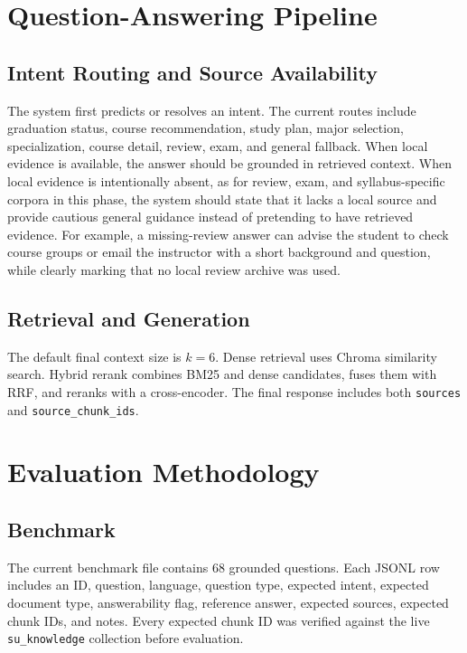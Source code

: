 \documentclass[11pt]{article}
\begin{document}
\section{Question-Answering Pipeline}
\subsection{Intent Routing and Source Availability}
The system first predicts or resolves an intent. The current routes include graduation status, course recommendation, study plan, major selection, specialization, course detail, review, exam, and general fallback. When local evidence is available, the answer should be grounded in retrieved context. When local evidence is intentionally absent, as for review, exam, and syllabus-specific corpora in this phase, the system should state that it lacks a local source and provide cautious general guidance instead of pretending to have retrieved evidence. For example, a missing-review answer can advise the student to check course groups or email the instructor with a short background and question, while clearly marking that no local review archive was used.

\subsection{Retrieval and Generation}
The default final context size is $k=6$. Dense retrieval uses Chroma similarity search. Hybrid rerank combines BM25 and dense candidates, fuses them with RRF, and reranks with a cross-encoder. The final response includes both \texttt{sources} and \texttt{source\_chunk\_ids}.



\section{Evaluation Methodology}
\subsection{Benchmark}
The current benchmark file contains 68 grounded questions. Each JSONL row includes an ID, question, language, question type, expected intent, expected document type, answerability flag, reference answer, expected sources, expected chunk IDs, and notes. Every expected chunk ID was verified against the live \texttt{su\_knowledge} collection before evaluation.
\end{document}
